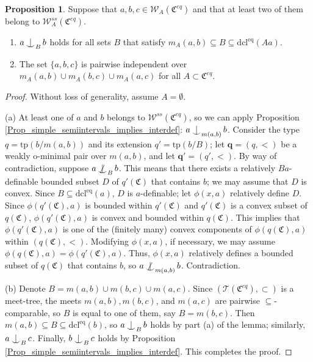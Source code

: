 \documentclass{amsart}
\theoremstyle{definition}
\newtheorem{Proposition}[Theorem]{Proposition}
\theoremstyle{definition}
\def\Ind#1#2{#1\setbox0=\hbox{$#1x$}\kern\wd0\hbox to 0pt{\hss$#1\mid$\hss}
\lower.9\ht0\hbox to 0pt{\hss$#1\smile$\hss}\kern\wd0}
\def\ind{\mathop{\mathpalette\Ind{}}}
\def\notind#1#2{#1\setbox0=\hbox{$#1x$}\kern\wd0
\hbox to 0pt{\mathchardef\nn=12854\hss$#1\nn$\kern1.4\wd0\hss}
\hbox to 0pt{\hss$#1\mid$\hss}\lower.9\ht0 \hbox to 0pt{\hss$#1\smile$\hss}\kern\wd0}
\def\dep{\mathop{\mathpalette\notind{}}}
\newcommand{\Mon}{\mathfrak C}
\newcommand{\Moneq}{\mathfrak C^{eq}}
\newcommand{\tp}{\mathrm{tp}}
\newcommand{\dcleq}{\mathrm{dcl^{eq}}}
\begin{document}
\begin{Proposition}\label{Lemma_triple_noshiftsconsequence}
 Suppose that $a,b,c\in\mathcal W_A(\Moneq)$ and that at least two of them belong to $\mathcal W_A^{ss}(\Moneq)$. 
\begin{enumerate}[\hspace{10pt} (a)]
    \item  $a\ind_B b$ holds for all sets $B$ that satisfy $m_A(a,b)\subseteq B \subseteq \dcleq(Aa)$. 
    \item  The set $\{a,b,c\}$ is pairwise independent over $  m_A(a,b)\cup   m_A(b,c)\cup   m_A(a,c)$ for all $A\subset \Moneq$. 
\end{enumerate}
\end{Proposition}
\begin{proof}
Without loss of generality, assume $A=\emptyset$.
 
(a) At least one of $a$ and $b$ belongs to $
\mathcal W^{ss}(\Moneq)$, so we can apply Proposition \ref{Prop_simple_semiintervals_implies_interdef}: $a\ind_{m(a,b)}b$. Consider the type $q=\tp(b/m(a,b))$ and its extension $q'=\tp(b/B)$; let $\mathbf q=(q,<)$ be a weakly o-minimal pair over $m(a,b)$, and let $\mathbf q'=(q',<)$. By way of contradiction, suppose $a\dep_Bb$. This means that there exists a relatively $Ba$-definable bounded subset $D$ of $q'(\Mon)$ that contains $b$; we may assume that $D$ is convex. Since $B\subseteq\dcleq(a)$, $D$ is $a$-definable; let $\phi(x,a)$ relatively define $D$. Since $\phi(q'(\Mon),a)$ is bounded within $q'(\Mon)$ and $q'(\Mon)$ is a convex subset of $q(\Mon)$, $\phi(q'(\Mon),a)$ is convex and bounded within $q(\Mon)$. This implies that $\phi(q'(\Mon),a)$ is one of the (finitely many) convex components of $\phi(q(\Mon),a)$ within $(q(\Mon),<)$. Modifying $\phi(x,a)$, if necessary, we may assume $\phi(q(\Mon),a)=\phi(q'(\Mon),a)$. Thus, $\phi(x,a)$ relatively defines a bounded subset of $q(\Mon)$ that contains $b$, so $a\dep_{m(a,b)}b$. Contradiction.

    
(b) Denote $B= m(a,b)\cup  m(b,c)\cup  m(a,c)$. Since $(\mathcal T(\Moneq),\subset)$ is a meet-tree, the meets $m(a,b), m(b,c)$, and $ m(a,c)$ are pairwise $\subseteq$-comparable, so $B$ is equal to one of them, say $B= m(b,c)$. Then $ m(a,b)\subseteq B \subseteq \dcleq(b)$, so 
$a\ind_B b$ holds by part (a) of the lemma; similarly,  $a\ind_B c$. Finally,   $b\ind_B c$ holds  by Proposition \ref{Prop_simple_semiintervals_implies_interdef}.
This completes the proof.
\end{proof}
\end{document}
